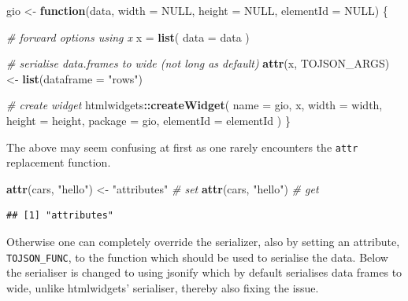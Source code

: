 \documentclass[
]{krantz}
\makeatletter
\newenvironment{Shaded}{\begin{snugshade}}{\end{snugshade}}
\newcommand{\CommentTok}[1]{\textcolor[rgb]{0.37,0.37,0.37}{\textit{#1}}}
\newcommand{\ControlFlowTok}[1]{\textcolor[rgb]{0.27,0.27,0.27}{\textbf{#1}}}
\newcommand{\DataTypeTok}[1]{\textcolor[rgb]{0.27,0.27,0.27}{#1}}
\newcommand{\KeywordTok}[1]{\textcolor[rgb]{0.27,0.27,0.27}{\textbf{#1}}}
\newcommand{\NormalTok}[1]{#1}
\newcommand{\OperatorTok}[1]{\textcolor[rgb]{0.43,0.43,0.43}{\textbf{#1}}}
\newcommand{\OtherTok}[1]{\textcolor[rgb]{0.37,0.37,0.37}{#1}}
\newcommand{\StringTok}[1]{\textcolor[rgb]{0.5,0.5,0.5}{#1}}
\newenvironment{kframe}{%
\medskip{}
\setlength{\fboxsep}{.8em}
 \def\at@end@of@kframe{}%
 \ifinner\ifhmode%
  \def\at@end@of@kframe{\end{minipage}}%
  \begin{minipage}{\columnwidth}%
 \fi\fi%
 \def\FrameCommand##1{\hskip\@totalleftmargin \hskip-\fboxsep
 \colorbox{shadecolor}{##1}\hskip-\fboxsep
     \hskip-\linewidth \hskip-\@totalleftmargin \hskip\columnwidth}%
 \MakeFramed {\advance\hsize-\width
   \@totalleftmargin\z@ \linewidth\hsize
   \@setminipage}}%
 {\par\unskip\endMakeFramed%
 \at@end@of@kframe}
\renewenvironment{Shaded}{\begin{kframe}}{\end{kframe}}
\makeatother
\begin{document}
\begin{Shaded}
\begin{Highlighting}[]
\NormalTok{gio <{-}}\StringTok{ }\ControlFlowTok{function}\NormalTok{(data, }\DataTypeTok{width =} \OtherTok{NULL}\NormalTok{, }\DataTypeTok{height =} \OtherTok{NULL}\NormalTok{, }\DataTypeTok{elementId =} \OtherTok{NULL}\NormalTok{) \{}

  \CommentTok{\# forward options using x}
\NormalTok{  x =}\StringTok{ }\KeywordTok{list}\NormalTok{(}
    \DataTypeTok{data =}\NormalTok{ data}
\NormalTok{  )}

  \CommentTok{\# serialise data.frames to wide (not long as default)}
  \KeywordTok{attr}\NormalTok{(x, }\StringTok{\textquotesingle{}TOJSON\_ARGS\textquotesingle{}}\NormalTok{) <{-}}\StringTok{ }\KeywordTok{list}\NormalTok{(}\DataTypeTok{dataframe =} \StringTok{"rows"}\NormalTok{)}

  \CommentTok{\# create widget}
\NormalTok{  htmlwidgets}\OperatorTok{::}\KeywordTok{createWidget}\NormalTok{(}
    \DataTypeTok{name =} \StringTok{\textquotesingle{}gio\textquotesingle{}}\NormalTok{,}
\NormalTok{    x,}
    \DataTypeTok{width =}\NormalTok{ width,}
    \DataTypeTok{height =}\NormalTok{ height,}
    \DataTypeTok{package =} \StringTok{\textquotesingle{}gio\textquotesingle{}}\NormalTok{,}
    \DataTypeTok{elementId =}\NormalTok{ elementId}
\NormalTok{  )}
\NormalTok{\}}
\end{Highlighting}
\end{Shaded}

The above may seem confusing at first as one rarely encounters the \texttt{attr} replacement function.

\begin{Shaded}
\begin{Highlighting}[]
\KeywordTok{attr}\NormalTok{(cars, }\StringTok{"hello"}\NormalTok{) <{-}}\StringTok{ "attributes"} \CommentTok{\# set }
\KeywordTok{attr}\NormalTok{(cars, }\StringTok{"hello"}\NormalTok{) }\CommentTok{\# get }
\end{Highlighting}
\end{Shaded}

\begin{verbatim}
## [1] "attributes"
\end{verbatim}

Otherwise one can completely override the serializer, also by setting an attribute, \texttt{TOJSON\_FUNC}, to the function which should be used to serialise the data. Below the serialiser is changed to using jsonify \citep{R-jsonify} which by default serialises data frames to wide, unlike htmlwidgets' serialiser, thereby also fixing the issue.
\end{document}
